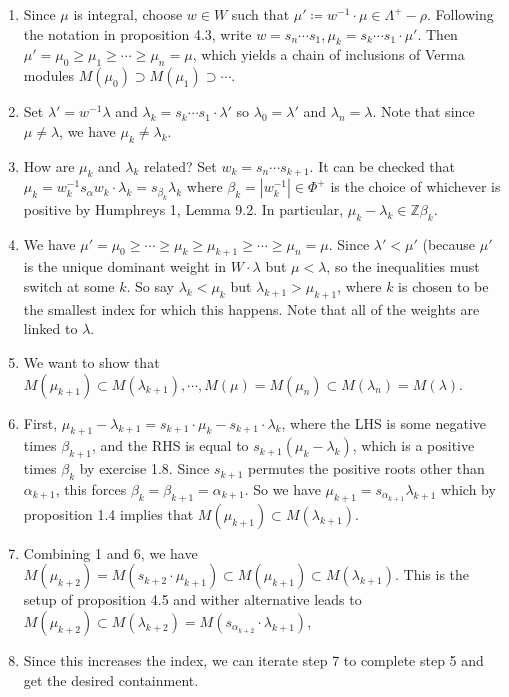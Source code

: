 \documentclass[11pt]{scrartcl}
\theoremstyle{definition}
\theoremstyle{theorem}
\theoremstyle{proof}
\theoremstyle{definition}
\theoremstyle{break}
\theoremstyle{problem}
\DeclarePairedDelimiter\qty{(}{)}
\renewcommand{\qty}[1]{{\left(  {#1} \right)}}
\newcommand{\ZZ}[0]{{\mathbb{Z}}}
\newcommand{\abs}[1]{{\left\lvert {#1} \right\rvert}}
\newcommand{\definedas}[0]{\coloneqq}
\newcommand{\inv}[0]{^{-1}}
\begin{document}
\begin{enumerate}
\def\labelenumi{\arabic{enumi}.}
\item
  Since \(\mu\) is integral, choose \(w\in W\) such that
  \(\mu' \definedas w\inv \cdot \mu \in \Lambda^+ - \rho\). Following
  the notation in proposition 4.3, write
  \(w = s_n \cdots s_1, \mu_k = s_k \cdots s_1 \cdot \mu'\). Then
  \(\mu' = \mu_0 \geq \mu_1 \geq \cdots \geq \mu_n = \mu\), which yields
  a chain of inclusions of Verma modules
  \(M(\mu_0) \supset M(\mu_1) \supset \cdots\).
\item
  Set \(\lambda' = w\inv \lambda\) and
  \(\lambda_k = s_k \cdots s_1 \cdot \lambda'\) so
  \(\lambda_0 = \lambda'\) and \(\lambda_n = \lambda\). Note that since
  \(\mu \neq \lambda\), we have \(\mu_k \neq \lambda_k\).
\item
  How are \(\mu_k\) and \(\lambda_k\) related? Set
  \(w_k = s_n \cdots s_{k+1}\). It can be checked that
  \(\mu_k = w_k\inv s_\alpha w_k \cdot \lambda_k = s_{\beta_k} \lambda_k\)
  where \(\beta_k = \abs{w_k\inv} \in \Phi^+\) is the choice of
  whichever is positive by Humphreys 1, Lemma 9.2. In particular,
  \(\mu_k - \lambda_k \in \ZZ \beta_k\).
\item
  We have
  \(\mu' = \mu_0 \geq \cdots \geq \mu_k \geq \mu_{k+1} \geq \cdots \geq \mu_n = \mu\).
  Since \(\lambda'<\mu'\) (because \(\mu'\) is the unique dominant
  weight in \(W\cdot \lambda\) but \(\mu < \lambda\), so the
  inequalities must switch at some \(k\). So say \(\lambda_k < \mu_k\)
  but \(\lambda_{k+1} > \mu_{k+1}\), where \(k\) is chosen to be the
  smallest index for which this happens. Note that all of the weights
  are linked to \(\lambda\).
\item
  We want to show that
  \(M(\mu_{k+1}) \subset M(\lambda_{k+1}), \cdots, M(\mu) = M(\mu_n) \subset M(\lambda_n) = M(\lambda)\).
\item
  First,
  \(\mu_{k+1} - \lambda_{k+1} = s_{k+1} \cdot \mu_k - s_{k+1} \cdot \lambda_k\),
  where the LHS is some negative times \(\beta_{k+1}\), and the RHS is
  equal to \(s_{k+1} \qty{ \mu_k - \lambda_k }\), which is a positive
  times \(\beta_k\) by exercise 1.8. Since \(s_{k+1}\) permutes the
  positive roots other than \(\alpha_{k+1}\), this forces
  \(\beta_k = \beta_{k+1} = \alpha_{k+1}\). So we have
  \(\mu_{k+1} = s_{\alpha_{k+1}} \lambda_{k+1}\) which by proposition
  1.4 implies that \(M(\mu_{k+1}) \subset M(\lambda_{k+1})\).
\item
  Combining 1 and 6, we have
  \(M(\mu_{k+2}) = M(s_{k+2} \cdot \mu_{k+1}) \subset M(\mu_{k+1}) \subset M(\lambda_{k+1})\).
  This is the setup of proposition 4.5 and wither alternative leads to
  \(M(\mu_{k+2}) \subset M(\lambda_{k+2}) = M(s_{\alpha_{k+2}} \cdot \lambda_{k+1})\),
\item
  Since this increases the index, we can iterate step 7 to complete step
  5 and get the desired containment.
\end{enumerate}
\end{document}
